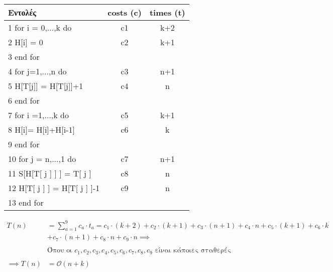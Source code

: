 \documentclass[a4paper, fleqn]{article}
\begin{document}
\begin{tabular}{|l|c|c|}
\hline
Εντολές & costs (c) & times (t) \\\hline
1  for i = 0,...,k do   & c1 & k+2\\\hline
2  H[i] = 0 & c2 & k+1 \\\hline
3  end for & & \\\hline
4  for j=1,...,n do & c3 & n+1 \\\hline 
5 H[T[j]] = H[T[j]]+1 & c4 & n  \\\hline
6 end for &  & \\\hline
7 for i =1,...,k do & c5 & k+1   \\\hline
8 H[i]= H[i]+H[i-1] & c6 & k \\\hline
9 end for & &   \\\hline 
10 for j = n,...,1 do & c7 & n+1 \\\hline
11 S[H[T[ j ] ] ] = T[ j ] & c8 & n \\\hline
12 H[T[ j ] ] = H[T[ j ] ]-1 & c9 & n \\\hline
13 end for & &  \\\hline
\end{tabular}

\begin{align*}
T(n)&= \sum_{a=1}^{9} c_a\cdot t_a =  c_1\cdot (k+2) + c_2\cdot (k+1) + c_3\cdot (n+1) + c_4\cdot n + c_5\cdot (k+1) + c_6\cdot k \\
    &+ c_7\cdot (n+1) + c_8\cdot n + c_9\cdot n \implies \\\\
&\text{Όπου οι $c_1,c_2,c_3,c_4,c_5,c_6,c_7,c_8,c_9$ είναι κάποιες σταθερές}\\\\
\implies T(n)&= \mathcal{O}(n+k)
\end{align*}
\end{document}
